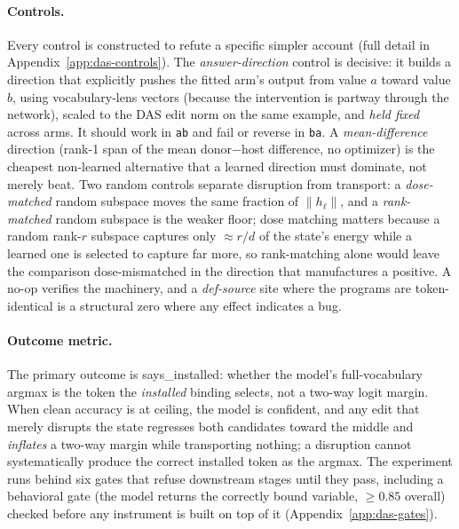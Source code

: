 \documentclass[10pt]{article}
\newcommand{\hb}{h_{\ell}}
\newcommand{\says}{\textsf{says\_installed}}
\newcommand{\code}[1]{\texttt{#1}}
\begin{document}
\paragraph{Controls.} Every control is constructed to refute a specific simpler
account (full detail in Appendix~\ref{app:das-controls}). The
\emph{answer-direction} control is decisive: it builds a direction that
explicitly pushes the fitted arm's output from value $a$ toward value $b$, using
vocabulary-lens vectors (because the intervention is partway through the network),
scaled to the DAS edit norm on the same example, and \emph{held fixed} across
arms. It should work in \code{ab} and fail or reverse in \code{ba}. A
\emph{mean-difference} direction (rank-1 span of the mean donor$-$host difference,
no optimizer) is the cheapest non-learned alternative that a learned direction
must dominate, not merely beat. Two random controls separate disruption from
transport: a \emph{dose-matched} random subspace moves the same fraction of
$\|\hb\|$, and a \emph{rank-matched} random subspace is the weaker floor; dose
matching matters because a random rank-$r$ subspace captures only $\approx r/d$ of
the state's energy while a learned one is selected to capture far more, so
rank-matching alone would leave the comparison dose-mismatched in the direction
that manufactures a positive. A no-op verifies the machinery, and a
\emph{def-source} site where the programs are token-identical is a structural zero
where any effect indicates a bug.

\paragraph{Outcome metric.} The primary outcome is \says{}: whether the model's
full-vocabulary argmax is the token the \emph{installed} binding selects, not a
two-way logit margin. When clean accuracy is at ceiling, the model is confident,
and any edit that merely disrupts the state regresses both candidates toward the
middle and \emph{inflates} a two-way margin while transporting nothing; a
disruption cannot systematically produce the correct installed token as the
argmax. The experiment runs behind six gates that refuse downstream stages until
they pass, including a behavioral gate (the model returns the correctly bound
variable, $\geq 0.85$ overall) checked before any instrument is built on top of
it (Appendix~\ref{app:das-gates}).
\end{document}
